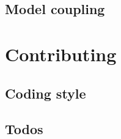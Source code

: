 \documentclass[a4paper]{article}
\begin{document}
\subsection{Model coupling} \label{ssec:coupling}



\newpage
\section{Contributing} \label{sec:contributing}

\subsection{Coding style} \label{ssec:coding_style}

\subsection{Todos} \label{ssec:todos}




\newpage
 
 
\end{document}
